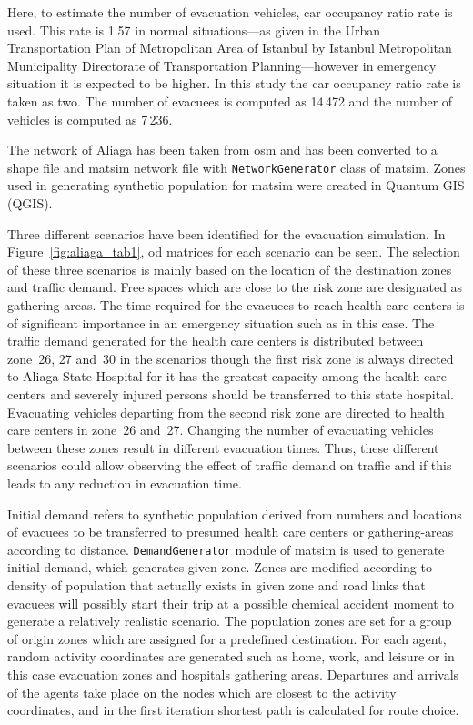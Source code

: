 Here, to estimate the number of evacuation vehicles, car occupancy ratio rate is used. This rate is 1.57 in normal situations---as given in the Urban Transportation Plan of Metropolitan Area of Istanbul by
Istanbul Metropolitan Municipality Directorate of Transportation Planning---however in emergency situation it is expected to be higher. In this study the car occupancy ratio rate is taken as two. The number of evacuees is computed as 14\,472 and the number of vehicles is computed as 7\,236.

The network of Aliaga has been taken from \gls{osm} and has been converted to a shape file and \gls{matsim} network file with \lstinline|NetworkGenerator| class of \gls{matsim}. Zones used in generating synthetic population for \gls{matsim} were created in Quantum GIS (QGIS).

Three different scenarios have been identified for the evacuation simulation. In Figure~\ref{fig:aliaga_tab1}, \gls{od} matrices for each scenario can be seen. The selection of these three scenarios is mainly based on the location of the destination zones and traffic demand. Free spaces which are close to the risk zone are designated as gathering-areas. The time required for the evacuees to reach health care centers is of significant importance in an emergency situation such as in this case. The traffic demand generated for the health care centers is distributed between zone~26, 27 and~30 in the scenarios though the first risk zone is always directed to Aliaga State Hospital for it has the greatest capacity among the health care centers and severely injured persons should be transferred to this state hospital. Evacuating vehicles departing from the second risk zone are directed to health care centers in zone~26 and~27. Changing the number of evacuating vehicles between these zones result in different evacuation times. Thus, these different scenarios could allow observing the effect of traffic demand on traffic and if this leads to any reduction in evacuation time.

Initial demand refers to synthetic population derived from numbers and locations of evacuees to be transferred to presumed health care centers or gathering-areas according to distance. \lstinline|DemandGenerator| module of \gls{matsim}  is used to generate initial demand, which generates given zone. Zones are modified according to density of population that actually exists in given zone and road links that evacuees will possibly start their trip at a possible chemical accident moment to generate a relatively realistic scenario. The population zones are set for a group of origin zones which are assigned for a predefined destination. For each agent, random activity coordinates are generated such as home, work, and leisure or in this case evacuation zones and hospitals gathering areas. Departures and arrivals of the agents take place on the nodes which are closest to the activity coordinates, and in the first iteration shortest path is calculated for route choice.

